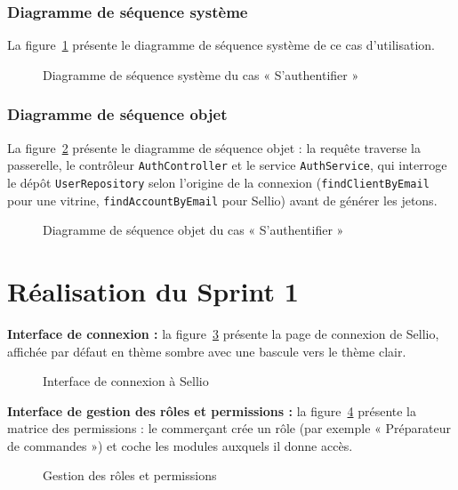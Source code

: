 \subsubsection{Diagramme de séquence système}
La figure~\ref{fig:dss-login} présente le diagramme de séquence système de ce cas d'utilisation.
\begin{figure}[H]
    \centering
    \caption{Diagramme de séquence système du cas « S'authentifier »}
    \label{fig:dss-login}
\end{figure}

\subsubsection{Diagramme de séquence objet}
La figure~\ref{fig:dso-login} présente le diagramme de séquence objet : la requête traverse la passerelle, le contrôleur \texttt{AuthController} et le service \texttt{AuthService}, qui interroge le dépôt \texttt{UserRepository} selon l'origine de la connexion (\texttt{findClientByEmail} pour une vitrine, \texttt{findAccountByEmail} pour Sellio) avant de générer les jetons.
\begin{figure}[H]
    \centering
    \caption{Diagramme de séquence objet du cas « S'authentifier »}
    \label{fig:dso-login}
\end{figure}

\section{Réalisation du Sprint 1}
\textbf{Interface de connexion :} la figure~\ref{fig:ui-login} présente la page de connexion de Sellio, affichée par défaut en thème sombre avec une bascule vers le thème clair.
\begin{figure}[H]
    \centering
    \caption{Interface de connexion à Sellio}
    \label{fig:ui-login}
\end{figure}

\textbf{Interface de gestion des rôles et permissions :} la figure~\ref{fig:ui-roles} présente la matrice des permissions : le commerçant crée un rôle (par exemple « Préparateur de commandes ») et coche les modules auxquels il donne accès.
\begin{figure}[H]
    \centering
    \caption{Gestion des rôles et permissions}
    \label{fig:ui-roles}
\end{figure}


